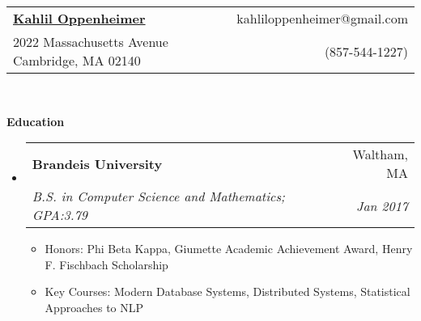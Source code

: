 \documentclass[letterpaper,11pt]{article}
\makeatletter
\newcommand{\resitem}[1]{\item #1 \vspace{-2pt}}
\newcommand{\resheading}[1]{{\large \colorbox{mygrey}{\begin{minipage}{\textwidth}{\textbf{#1 \vphantom{p\^{E}}}}\end{minipage}}}}
\newcommand{\ressubheading}[4]{
\begin{tabular*}{6.5in}{l@{\extracolsep{\fill}}r}
		\textbf{#1} & #2 \\
		\textit{#3} & \textit{#4} \\
\end{tabular*}\vspace{-6pt}}
\makeatother
\begin{document}
\newcommand{\mywebheader}{
\begin{tabular*}{7in}{l@{\extracolsep{\fill}}r}
	\textbf{\LARGE \href{https://kahlil.me}{Kahlil Oppenheimer}} & {kahliloppenheimer@gmail.com} \\
2022 Massachusetts Avenue Cambridge, MA 02140 & (857-544-1227) \\
	\end{tabular*}
\\
\vspace{0.1in}}

\mywebheader

\resheading{Education}
	\begin{itemize}
		\item
			\ressubheading{Brandeis University}{Waltham, MA}{B.S. in Computer Science and Mathematics; GPA:3.79}{Jan 2017}
				{ \footnotesize
				\begin{itemize}
                    \resitem{Honors: Phi Beta Kappa, Giumette Academic Achievement Award, Henry F. Fischbach Scholarship}
					\resitem{Key Courses: Modern Database Systems, Distributed Systems, Statistical Approaches to NLP}
				\end{itemize}
				}
	\end{itemize} %
\end{document}
